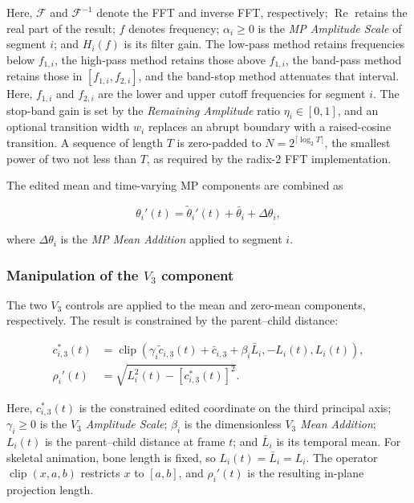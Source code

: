 \documentclass[12pt]{article}
\begin{document}
Here, $\mathcal{F}$ and $\mathcal{F}^{-1}$ denote the FFT and inverse
FFT, respectively; $\operatorname{Re}$ retains the real part of the
result; $f$ denotes frequency; $\alpha_i\geq0$ is the
\textit{MP Amplitude Scale} of segment $i$; and $H_i(f)$ is its filter
gain. The low-pass method retains frequencies below $f_{1,i}$, the
high-pass method retains those above $f_{1,i}$, the band-pass method
retains those in $[f_{1,i},f_{2,i}]$, and the band-stop method attenuates
that interval. Here, $f_{1,i}$ and $f_{2,i}$ are the lower and upper
cutoff frequencies for segment $i$. The stop-band gain is set by the
\textit{Remaining Amplitude} ratio $\eta_i\in[0,1]$, and an optional
transition width $w_i$ replaces an abrupt boundary with a raised-cosine
transition. A sequence of length $T$ is zero-padded to
$N=2^{\lceil\log_2 T\rceil}$, the smallest power of two not less than $T$,
as required by the radix-2 FFT implementation.

The edited mean and time-varying MP components are combined as

\begin{equation}
\theta_i'(t)
=
\tilde{\theta}_i'(t)
+
\bar{\theta}_i+\Delta\theta_i,
\label{eq:sup-edited-theta}
\end{equation}

where $\Delta\theta_i$ is the \textit{MP Mean Addition} applied to
segment $i$.


\subsubsection{Manipulation of the \texorpdfstring{$V_3$}{V3} component}
\label{sup:v3-manipulation}

The two $V_3$ controls are applied to the mean and zero-mean components,
respectively. The result is constrained by the parent--child distance:

\begin{align}
c_{i,3}^{*}(t)
&=
\operatorname{clip}
\left(
\gamma_i\tilde{c}_{i,3}(t)+\bar{c}_{i,3}+\beta_i\bar{L}_i,
-L_i(t),L_i(t)
\right),
\label{eq:sup-v3-edit}\\
\rho_i'(t)
&=
\sqrt{
L_i^2(t)
-
\left[c_{i,3}^{*}(t)\right]^2
}.
\label{eq:sup-new-radius}
\end{align}

Here, $c_{i,3}^{*}(t)$ is the constrained edited coordinate on the
third principal axis; $\gamma_i\geq0$ is the \textit{$V_3$ Amplitude
Scale}; $\beta_i$ is the dimensionless \textit{$V_3$ Mean Addition};
$L_i(t)$ is the parent--child distance at frame $t$; and $\bar{L}_i$ is
its temporal mean. For skeletal animation, bone length is fixed, so
$L_i(t)=\bar{L}_i=L_i$. The operator $\operatorname{clip}(x,a,b)$
restricts $x$ to $[a,b]$, and $\rho_i'(t)$ is the resulting in-plane
projection length.
\end{document}
